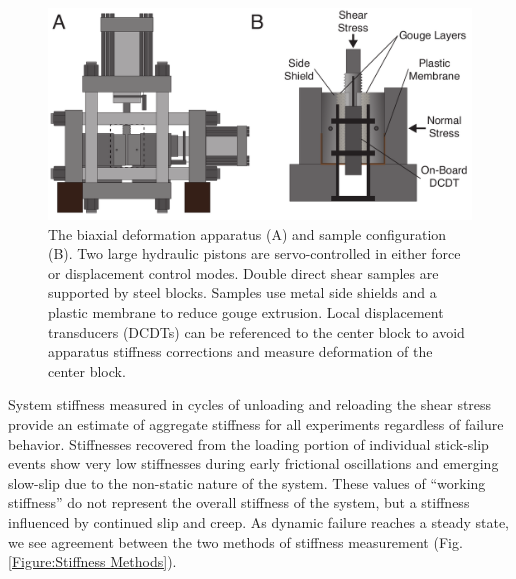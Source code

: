 \documentclass[11pt]{article}
\begin{document}
\begin{figure}
	\centering
	\includegraphics[scale=0.5]{../Figures/Fig_Biax_Schematic/biax_schematic.pdf}
   	\caption{The biaxial deformation apparatus (A) and sample configuration (B).
   	Two large hydraulic pistons are servo-controlled in either force or
   	displacement control modes. Double direct shear samples are supported by
   	steel blocks. Samples use metal side shields and a plastic membrane to
   	reduce gouge extrusion.  Local displacement transducers (DCDTs) can be
   	referenced to the center block to avoid apparatus stiffness corrections and
   	measure deformation of the center block.}
  	\label{Fig:Biax Schematic}
\end{figure}

System stiffness measured in cycles of unloading and reloading the shear stress
provide an estimate of aggregate stiffness for all experiments regardless of
failure behavior. Stiffnesses recovered from the loading portion of individual
stick-slip events show very low stiffnesses during early frictional oscillations
and emerging slow-slip due to the non-static nature of the system. These values
of “working stiffness” do not represent the overall stiffness of the system, but
a stiffness influenced by continued slip and creep. As dynamic failure reaches a
steady state, we see agreement between the two methods of stiffness measurement
(Fig.\ref{Figure:Stiffness Methods}).
\end{document}
